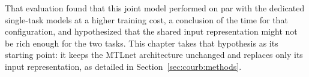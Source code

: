 That evaluation \cite{silva2025mtlnet} found that this joint model performed on par with the dedicated single-task models at a higher training cost, a conclusion of the time for that configuration, and hypothesized that the shared input representation might not be rich enough for the two tasks. This chapter takes that hypothesis as its starting point: it keeps the MTLnet architecture unchanged and replaces only its input representation, as detailed in Section~\ref{sec:courb:methods}.
